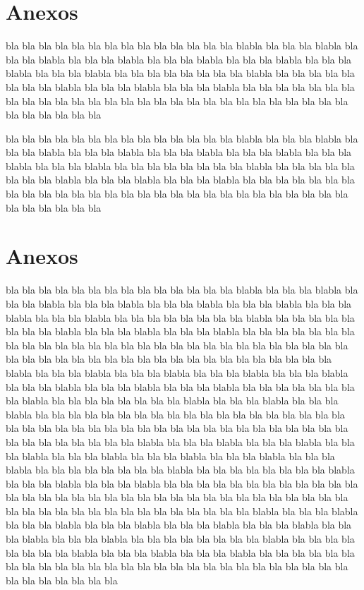 \documentclass[11pt]{report}
\begin{document}
\section{Anexos}


bla bla bla bla bla bla bla bla bla bla bla bla bla bla blabla bla bla bla blabla bla bla bla blabla bla bla bla blabla bla bla bla blabla bla bla bla blabla bla bla bla blabla bla bla bla blabla bla bla bla bla bla bla bla bla blabla bla bla bla bla bla bla bla bla blabla bla bla bla blabla bla bla bla blabla bla bla bla bla bla bla bla bla bla bla bla bla bla bla bla bla bla bla bla bla bla bla bla bla bla bla bla bla bla bla bla bla bla bla 

bla bla bla bla bla bla bla bla bla bla bla bla bla bla blabla bla bla bla blabla bla bla bla blabla bla bla bla blabla bla bla bla blabla bla bla bla blabla bla bla bla blabla bla bla bla blabla bla bla bla bla bla bla bla bla blabla bla bla bla bla bla bla bla bla blabla bla bla bla blabla bla bla bla blabla bla bla bla bla bla bla bla bla bla bla bla bla bla bla bla bla bla bla bla bla bla bla bla bla bla bla bla bla bla bla bla bla bla bla 

\section{Anexos}


bla bla bla bla bla bla bla bla bla bla bla bla bla bla blabla bla bla bla blabla bla bla bla blabla bla bla bla blabla bla bla bla blabla bla bla bla blabla bla bla bla blabla bla bla bla blabla bla bla bla bla bla bla bla bla blabla bla bla bla bla bla bla bla bla blabla bla bla bla blabla bla bla bla blabla bla bla bla bla bla bla bla bla bla bla bla bla bla bla bla bla bla bla bla bla bla bla bla bla bla bla bla bla bla bla bla bla bla bla
bla bla bla bla bla bla bla bla bla bla bla bla bla bla blabla bla bla bla blabla bla bla bla blabla bla bla bla blabla bla bla bla blabla bla bla bla blabla bla bla bla blabla bla bla bla blabla bla bla bla bla bla bla bla bla blabla bla bla bla bla bla bla bla bla blabla bla bla bla blabla bla bla bla blabla bla bla bla bla bla bla bla bla bla bla bla bla bla bla bla bla bla bla bla bla bla bla bla bla bla bla bla bla bla bla bla bla bla bla
bla bla bla bla bla bla bla bla bla bla bla bla bla bla blabla bla bla bla blabla bla bla bla blabla bla bla bla blabla bla bla bla blabla bla bla bla blabla bla bla bla blabla bla bla bla blabla bla bla bla bla bla bla bla bla blabla bla bla bla bla bla bla bla bla blabla bla bla bla blabla bla bla bla blabla bla bla bla bla bla bla bla bla bla bla bla bla bla bla bla bla bla bla bla bla bla bla bla bla bla bla bla bla bla bla bla bla bla bla
bla bla bla bla bla bla bla bla bla bla bla bla bla bla blabla bla bla bla blabla bla bla bla blabla bla bla bla blabla bla bla bla blabla bla bla bla blabla bla bla bla blabla bla bla bla blabla bla bla bla bla bla bla bla bla blabla bla bla bla bla bla bla bla bla blabla bla bla bla blabla bla bla bla blabla bla bla bla bla bla bla bla bla bla bla bla bla bla bla bla bla bla bla bla bla bla bla bla bla bla bla bla bla bla bla bla bla bla bla
\end{document}
